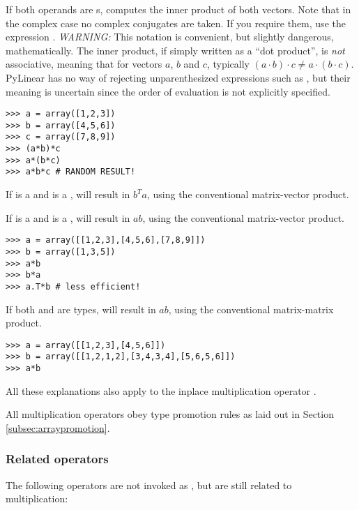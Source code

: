 If both operands are s,  computes the inner
product of both vectors. Note that in the complex case no complex
conjugates are taken. If you require them, use the expression
. \emph{WARNING:} This notation is convenient, but
slightly dangerous, mathematically. The inner product, if simply
written as a ``dot product'', is \emph{not} associative, meaning that
for vectors $a$, $b$ and $c$, typically $(a\cdot b)\cdot
c\not=a\cdot(b\cdot c)$.  PyLinear has no way of rejecting
unparenthesized expressions such as , but their meaning is
uncertain since the order of evaluation is not explicitly specified.

\begin{verbatim}
>>> a = array([1,2,3])
>>> b = array([4,5,6])
>>> c = array([7,8,9])
>>> (a*b)*c
>>> a*(b*c)
>>> a*b*c # RANDOM RESULT!
\end{verbatim}

If  is a  and  is a ,
 will result in $b^Ta$, using the conventional matrix-vector
product.

If  is a  and  is a ,
 will result in $a b$, using the conventional matrix-vector
product.

\begin{verbatim}
>>> a = array([[1,2,3],[4,5,6],[7,8,9]])
>>> b = array([1,3,5])
>>> a*b
>>> b*a
>>> a.T*b # less efficient!
\end{verbatim}

If both  and  are  types,
 will result in $a b$, using the conventional matrix-matrix
product.
\begin{verbatim}
>>> a = array([[1,2,3],[4,5,6]])
>>> b = array([[1,2,1,2],[3,4,3,4],[5,6,5,6]])
>>> a*b
\end{verbatim}

All these explanations also apply to the inplace multiplication
operator \code{*=}.

All multiplication operators obey type promotion rules as laid out
in Section \ref{subsec:arraypromotion}.

\subsubsection{Related operators}
The following operators are not invoked as , but are still
related to multiplication:

